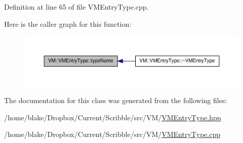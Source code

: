 Definition at line 65 of file V\-M\-Entry\-Type.\-cpp.



Here is the caller graph for this function\-:
\nopagebreak
\begin{figure}[H]
\begin{center}
\leavevmode
\includegraphics[width=350pt]{class_v_m_1_1_v_m_entry_type_ac4220642624d606264083b1ef60cca4f_icgraph}
\end{center}
\end{figure}




The documentation for this class was generated from the following files\-:\begin{DoxyCompactItemize}
\item 
/home/blake/\-Dropbox/\-Current/\-Scribble/src/\-V\-M/\hyperlink{_v_m_entry_type_8hpp}{V\-M\-Entry\-Type.\-hpp}\item 
/home/blake/\-Dropbox/\-Current/\-Scribble/src/\-V\-M/\hyperlink{_v_m_entry_type_8cpp}{V\-M\-Entry\-Type.\-cpp}\end{DoxyCompactItemize}
